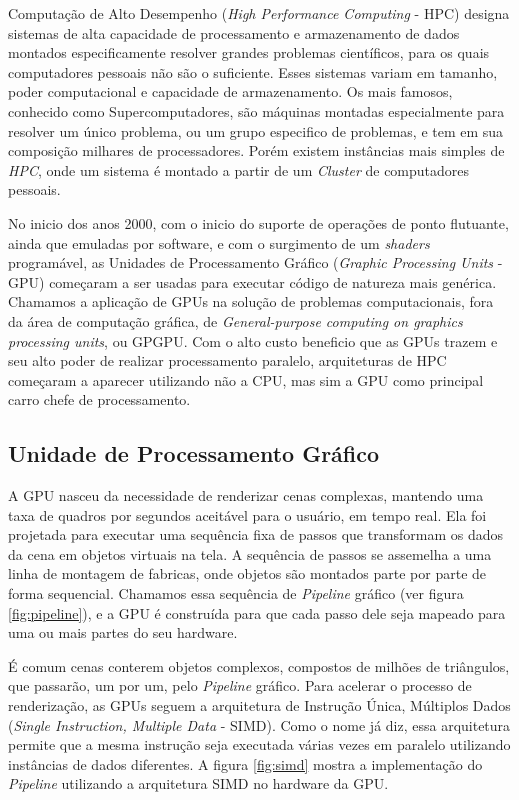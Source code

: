     Computação de Alto Desempenho (\textit{High Performance Computing} - HPC) designa sistemas de alta capacidade de processamento
e armazenamento de dados montados especificamente resolver grandes problemas científicos, para os quais computadores pessoais não
são o suficiente. Esses sistemas variam em tamanho, poder computacional e capacidade de armazenamento. Os mais famosos,
conhecido como Supercomputadores, são máquinas montadas especialmente para resolver um único problema, ou um grupo
especifico de problemas, e tem em sua composição milhares de processadores. Porém existem instâncias mais simples de 
\textit{HPC}, onde um sistema é montado a partir de um \textit{Cluster} de computadores pessoais.

    No inicio dos anos 2000, com o inicio do suporte de operações de ponto flutuante, ainda que emuladas por software, 
e com o surgimento de um \textit{shaders} programável, as Unidades de Processamento Gráfico 
(\textit{Graphic Processing Units} - GPU) começaram a ser usadas para executar código de natureza mais genérica.
Chamamos a aplicação de GPUs na solução de problemas computacionais, fora da área de computação gráfica, 
de \textit{General-purpose computing on graphics processing units}, ou GPGPU. Com o alto custo beneficio que as GPUs 
trazem e seu alto poder de realizar processamento paralelo, arquiteturas de HPC começaram a aparecer utilizando não a 
CPU, mas sim a GPU como principal carro chefe de processamento.

\subsection{Unidade de Processamento Gráfico}
    A GPU nasceu da necessidade de renderizar cenas complexas, mantendo uma taxa de quadros por segundos
aceitável para o usuário, em tempo real. Ela foi projetada para executar uma sequência fixa de passos que transformam
os dados da cena em objetos virtuais na tela. A sequência de passos se assemelha a uma linha de montagem de fabricas,
onde objetos são montados parte por parte de forma sequencial. Chamamos essa sequência de \textit{Pipeline} gráfico 
(ver figura \ref{fig:pipeline}), e a GPU é construída para que cada passo dele seja mapeado para uma ou mais partes do 
seu hardware.

    É comum cenas conterem objetos complexos, compostos de milhões de triângulos, que passarão, um por um, pelo
\textit{Pipeline} gráfico. Para acelerar o processo de renderização, as GPUs seguem a arquitetura de Instrução Única,
Múltiplos Dados (\textit{Single Instruction, Multiple Data} - SIMD). Como o nome já diz, essa arquitetura permite que 
a mesma instrução seja executada várias vezes em paralelo utilizando instâncias de dados diferentes. A figura 
\ref{fig:simd} mostra a implementação do \textit{Pipeline} utilizando a arquitetura SIMD no hardware da GPU.
    
